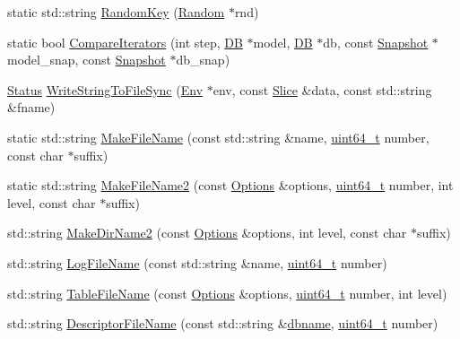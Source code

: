 \begin{DoxyCompactItemize}
\item 
static std\+::string \hyperlink{namespaceleveldb_a1c336258072dc26d61cabcda6bc2db75}{Random\+Key} (\hyperlink{classleveldb_1_1_random}{Random} $\ast$rnd)
\item 
static bool \hyperlink{namespaceleveldb_a5d2ddf843172352a05569e55d7b84a13}{Compare\+Iterators} (int step, \hyperlink{classleveldb_1_1_d_b}{D\+B} $\ast$model, \hyperlink{classleveldb_1_1_d_b}{D\+B} $\ast$db, const \hyperlink{classleveldb_1_1_snapshot}{Snapshot} $\ast$model\+\_\+snap, const \hyperlink{classleveldb_1_1_snapshot}{Snapshot} $\ast$db\+\_\+snap)
\item 
\hyperlink{classleveldb_1_1_status}{Status} \hyperlink{namespaceleveldb_aaa2ccf468819a9d769dd0bf38674a6e9}{Write\+String\+To\+File\+Sync} (\hyperlink{classleveldb_1_1_env}{Env} $\ast$env, const \hyperlink{classleveldb_1_1_slice}{Slice} \&data, const std\+::string \&fname)
\item 
static std\+::string \hyperlink{namespaceleveldb_a96df2d1ac438f65a90ba02abdb8eed3b}{Make\+File\+Name} (const std\+::string \&name, \hyperlink{stdint_8h_aaa5d1cd013383c889537491c3cfd9aad}{uint64\+\_\+t} number, const char $\ast$suffix)
\item 
static std\+::string \hyperlink{namespaceleveldb_ac3b827d545ffee33dcbe66949a8324b6}{Make\+File\+Name2} (const \hyperlink{structleveldb_1_1_options}{Options} \&options, \hyperlink{stdint_8h_aaa5d1cd013383c889537491c3cfd9aad}{uint64\+\_\+t} number, int level, const char $\ast$suffix)
\item 
std\+::string \hyperlink{namespaceleveldb_a56c4c068263c381f638d643c69cf4318}{Make\+Dir\+Name2} (const \hyperlink{structleveldb_1_1_options}{Options} \&options, int level, const char $\ast$suffix)
\item 
std\+::string \hyperlink{namespaceleveldb_ae5aadcd574cc5186e7821177d44f4c6c}{Log\+File\+Name} (const std\+::string \&name, \hyperlink{stdint_8h_aaa5d1cd013383c889537491c3cfd9aad}{uint64\+\_\+t} number)
\item 
std\+::string \hyperlink{namespaceleveldb_a9e8f4f891750cda3ff583ef557f844b6}{Table\+File\+Name} (const \hyperlink{structleveldb_1_1_options}{Options} \&options, \hyperlink{stdint_8h_aaa5d1cd013383c889537491c3cfd9aad}{uint64\+\_\+t} number, int level)
\item 
std\+::string \hyperlink{namespaceleveldb_a1ea160b70b18dc85b537e16db3d6ddd0}{Descriptor\+File\+Name} (const std\+::string \&\hyperlink{c__test_8c_a75d845559336df6843f3b599960f89d2}{dbname}, \hyperlink{stdint_8h_aaa5d1cd013383c889537491c3cfd9aad}{uint64\+\_\+t} number)

\end{DoxyCompactItemize}
